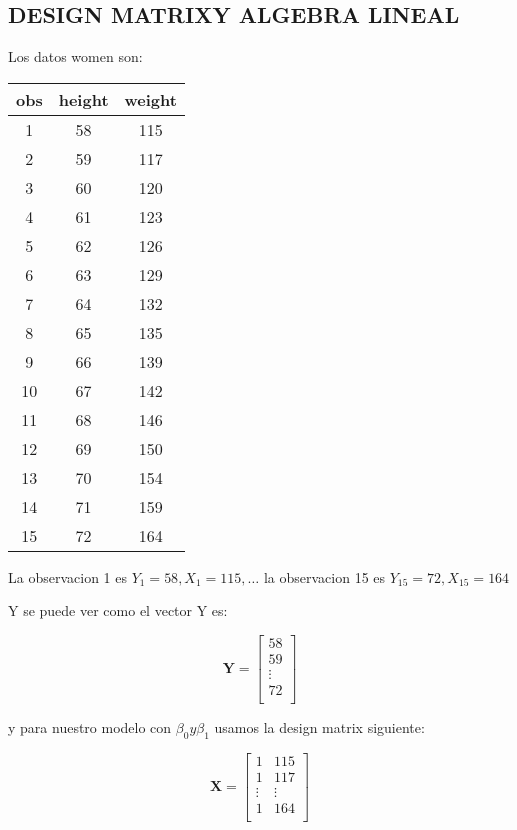 \documentclass[letterpaper,11pt]{article}\usepackage[]{graphicx}\usepackage[]{color}
\begin{document}
\begin{itemization}
{\section{DESIGN MATRIXY ALGEBRA LINEAL}
Los datos women son:

\begin{center}
 \begin{tabular}{||c c c||} 
 \hline
 obs & height & weight \\ [0.5ex] 
 \hline\hline
 1  &  58  &  115 \\ [0.5ex] 
 2  &  59  &  117 \\
 3  &  60  &  120 \\
 4  &  61  &  123 \\
 5  &  62  &  126 \\
 6  &  63  &  129 \\
 7  &  64  &  132 \\
 8  &  65  &  135 \\
 9  &  66  &  139 \\
10  &  67  &  142 \\
11  &  68  &  146 \\
12  &  69  &  150 \\
13  &  70  &  154 \\
14  &  71  &  159 \\
15  &  72  &  164 \\ [1ex] 
 \hline
\end{tabular}
\end{center}



La observacion 1 es $Y_{1}=58, X_{1}=115, \ldots$ la observacion 15 es $Y_{15}=72, X_{15}= 164$

Y se puede ver como el vector Y es:

	\[\pmb{Y}=
	\begin{bmatrix}
	58  \\
	59  \\
	\vdots \\
	72 	\\
	\end{bmatrix}
	\] 


y para nuestro modelo con $\beta_{0} y \beta_{1}$ usamos la design matrix siguiente:


	\[\pmb{X}=
	\begin{bmatrix}
	1 			& 115 	\\
	1 			& 117 	\\
	\vdots 	& \vdots  \\
	1 			& 164 	\\
	\end{bmatrix}
	\]
\\ \\

}
\end{itemization}
\end{document}
